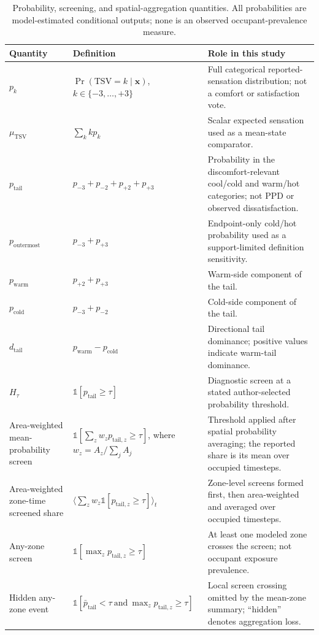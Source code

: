 \begin{table}[htbp]
\centering
\caption{Probability, screening, and spatial-aggregation quantities. All probabilities are model-estimated conditional outputs; none is an observed occupant-prevalence measure.}
\label{tab:metric_definitions}
\footnotesize
\begin{tabularx}{\textwidth}{@{}p{}p{}X@{}}
\toprule
\textbf{Quantity} & \textbf{Definition} & \textbf{Role in this study} \\
\midrule
$p_k$ & $\Pr(\mathrm{TSV}=k\mid\mathbf{x})$, $k\in\{-3,\ldots,+3\}$ & Full categorical reported-sensation distribution; not a comfort or satisfaction vote. \\
$\mu_{\mathrm{TSV}}$ & $\sum_k k p_k$ & Scalar expected sensation used as a mean-state comparator. \\
$p_{\mathrm{tail}}$ & $p_{-3}+p_{-2}+p_{+2}+p_{+3}$ & Probability in the discomfort-relevant cool/cold and warm/hot categories; not PPD or observed dissatisfaction. \\
$p_{\mathrm{outermost}}$ & $p_{-3}+p_{+3}$ & Endpoint-only cold/hot probability used as a support-limited definition sensitivity. \\
$p_{\mathrm{warm}}$ & $p_{+2}+p_{+3}$ & Warm-side component of the tail. \\
$p_{\mathrm{cold}}$ & $p_{-3}+p_{-2}$ & Cold-side component of the tail. \\
$d_{\mathrm{tail}}$ & $p_{\mathrm{warm}}-p_{\mathrm{cold}}$ & Directional tail dominance; positive values indicate warm-tail dominance. \\
$H_\tau$ & $\mathbb{1}[p_{\mathrm{tail}}\ge\tau]$ & Diagnostic screen at a stated author-selected probability threshold. \\
Area-weighted mean-probability screen & $\mathbb{1}[\sum_z w_zp_{\mathrm{tail},z}\ge\tau]$, where $w_z=A_z/\sum_jA_j$ & Threshold applied after spatial probability averaging; the reported share is its mean over occupied timesteps. \\
Area-weighted zone-time screened share & $\langle\sum_z w_z\mathbb{1}[p_{\mathrm{tail},z}\ge\tau]\rangle_t$ & Zone-level screens formed first, then area-weighted and averaged over occupied timesteps. \\
Any-zone screen & $\mathbb{1}[\max_z p_{\mathrm{tail},z}\ge\tau]$ & At least one modeled zone crosses the screen; not occupant exposure prevalence. \\
Hidden any-zone event & $\mathbb{1}[\bar p_{\mathrm{tail}}<\tau\ \mathrm{and}\ \max_zp_{\mathrm{tail},z}\ge\tau]$ & Local screen crossing omitted by the mean-zone summary; ``hidden'' denotes aggregation loss. \\
\bottomrule
\end{tabularx}
\end{table}

